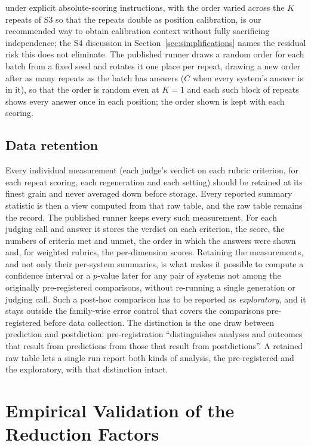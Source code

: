 \documentclass[11pt]{article}
\newcommand{\sectionbreak}{\par\ifdim\pagetotal<5.5\baselineskip\relax\else\clearpage\fi}
\begin{document}
under explicit absolute-scoring instructions, with the order varied across the $K$ repeats
of S3 so that the repeats double as position calibration, is our recommended way to obtain
calibration context without fully sacrificing independence; the S4 discussion in
Section~\ref{sec:simplifications} names the residual risk this does not eliminate. The published runner draws a random order for each batch from a fixed seed and rotates it one place per repeat, drawing a new order after as many repeats as the batch has answers ($C$ when every system's answer is in it), so that the order is random even at $K = 1$ and each such block of repeats shows every answer once in each position; the order shown is kept with each scoring.

\subsection{Data retention}
\label{sec:retention}

Every individual measurement (each judge's verdict on each rubric criterion, for each repeat scoring, each regeneration and each setting) should be retained at its finest grain and never averaged down before storage. Every reported summary statistic is then a view computed from that raw table, and the raw table remains the record. The published runner keeps every such measurement. For each judging call and answer it stores the verdict on each criterion, the score, the numbers of criteria met and unmet, the order in which the answers were shown and, for weighted rubrics, the per-dimension scores. Retaining the measurements, and not only their per-system summaries, is what makes it possible to
compute a confidence interval or a $p$-value later for any pair of systems not among the
originally pre-registered comparisons, without re-running a single generation or judging
call. Such a post-hoc comparison has to be reported as \emph{exploratory}, and it stays outside the family-wise error control that covers the comparisons pre-registered
before data collection. The distinction is the one \citet{nosek2018preregistration} draw
between prediction and postdiction: pre-registration ``distinguishes analyses and outcomes
that result from predictions from those that result from postdictions''. A retained
raw table lets a single run report both kinds of analysis, the pre-registered and the
exploratory, with that distinction intact.

\sectionbreak
\section{Empirical Validation of the Reduction Factors}
\label{sec:validation}
\end{document}
